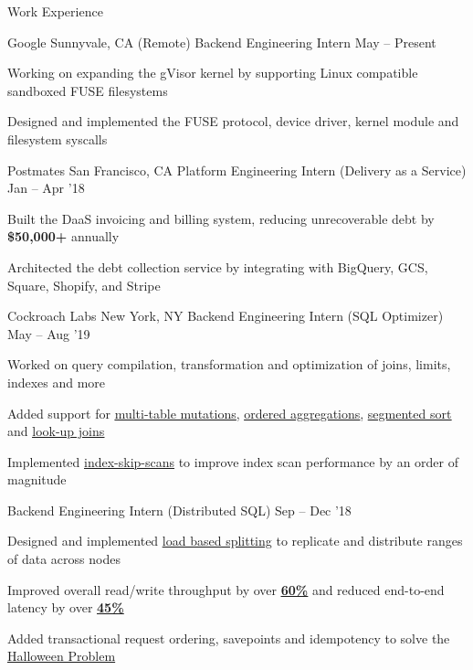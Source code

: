 \documentclass{resume} %
\begin{document}
\begin{rSection}{Work Experience}
  \begin{rWorkSection}{Google}
		     {Sunnyvale, CA (Remote)}
		     {Backend Engineering Intern}
		     {May -- Present}
    {
      \item Working on expanding the gVisor kernel by supporting Linux
        compatible sandboxed FUSE filesystems 
      \item Designed and implemented the
        FUSE protocol, device driver, kernel module and filesystem syscalls
    }
  \end{rWorkSection}
  \begin{rWorkSection}{Postmates}
		     {San Francisco, CA}
		     {Platform Engineering Intern (Delivery as a Service)}
		     {Jan -- Apr '18}
    {
      \item Built the DaaS invoicing and
        billing system, reducing unrecoverable debt by \textbf{\$50,000+} annually
      \item Architected the debt collection service by integrating with
        BigQuery, GCS, Square, Shopify, and Stripe
    }
  \end{rWorkSection}
  \begin{rDualWorkSection}{Cockroach Labs}
         {New York, NY}
         {Backend Engineering Intern (SQL Optimizer)}
         {May -- Aug '19}
    {
       \item Worked on query compilation, transformation and
         optimization of joins, limits, indexes and more
       \item Added support for  
         \href{https://github.com/cockroachdb/cockroach/pull/38452}{\ul{multi-table
           mutations}}, 
         \href{https://github.com/cockroachdb/cockroach/pull/38452}{\underline{ordered
           aggregations}}, 
         \href{https://github.com/cockroachdb/cockroach/pull/38452}{\underline{segmented
             sort}} and 
         \href{https://github.com/cockroachdb/cockroach/pull/38285}{\underline{look-up
           joins}}
       \item Implemented
         \href{https://github.com/cockroachdb/cockroach/pull/39668}{\ul{index-skip-scans}}
         to improve index scan performance by an order of magnitude
    }
    {Backend Engineering Intern (Distributed SQL)}
    {Sep -- Dec '18}
    {
       \item Designed and implemented \href{https://github.com/cockroachdb/cockroach/pull/31413}
      {\underline{load based splitting}} to replicate
      and distribute ranges of data across nodes
    \item Improved overall read/write throughput by over
         \setul{4pt}{.4pt}
         \href{https://github.com/cockroachdb/cockroach/issues/31819}{\textbf{\ul{60\%}}}
         and reduced end-to-end latency by over
         \href{https://github.com/cockroachdb/cockroach/issues/31819}{\textbf{\ul{45\%}}}
       \item Added transactional request
           ordering, savepoints and idempotency to solve the 
         \setul{4pt}{.4pt}
         \href{https://github.com/cockroachdb/cockroach/pull/33244}{\ul{Halloween
             Problem}}
    }
  \end{rDualWorkSection}


\end{rSection}
\end{document}
